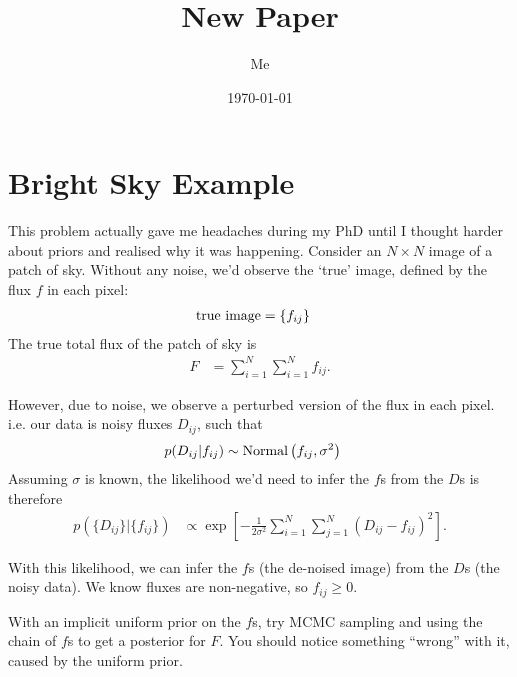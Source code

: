 \documentclass[a4paper, 11pt]{article}
\title{New Paper}
\author{Me}
\date{\today}
\begin{document}


\setlength{\parindent}{0pt}
\setlength{\parskip}{8pt}

\section{Bright Sky Example}
This problem actually gave me headaches during my PhD until
I thought harder about priors and realised why it was happening.
Consider an $N \times N$ image of a patch of sky. Without any noise,
we'd observe the `true' image, defined by the flux $f$ in each pixel:
\begin{align}
\textnormal{true image} &= \left\{f_{ij}\right\}
\end{align}
The true total flux of the patch of sky is
\begin{align}
F &= \sum_{i=1}^N \sum_{i=1}^N f_{ij}.
\end{align}

However, due to noise, we observe a perturbed version of the
flux in each pixel. i.e. our data is noisy fluxes $D_{ij}$,
such that
\begin{align}
p(D_{ij} | f_{ij}) &\sim \textnormal{Normal}\left(f_{ij}, \sigma^2\right)
\end{align}
Assuming $\sigma$ is known, the likelihood
we'd need to infer the $f$s from the $D$s
is therefore
\begin{align}
p\left(\{D_{ij}\} | \{f_{ij}\}\right)
&\propto \exp
\left[
  -\frac{1}{2\sigma^2}\sum_{i=1}^N\sum_{j=1}^N
                  \left(D_{ij} - f_{ij}\right)^2
\right].
\end{align}

With this likelihood, we can infer the $f$s
(the de-noised image) from the $D$s (the noisy data).
We know fluxes are non-negative, so $f_{ij} \geq 0$.

With an implicit uniform prior on the $f$s,
try MCMC sampling and using the chain of $f$s to
get a posterior for $F$. You should notice something
``wrong'' with it, caused by the uniform prior.




{}
\end{document}
